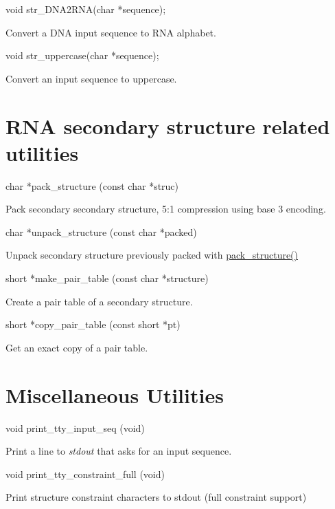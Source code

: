 \begin{DoxyVerb}void str_DNA2RNA(char *sequence);
\end{DoxyVerb}
 Convert a D\+NA input sequence to R\+NA alphabet.

\begin{DoxyVerb}void str_uppercase(char *sequence);
\end{DoxyVerb}
 Convert an input sequence to uppercase.

\hypertarget{mp_utils_utils_struc}{}\section{R\+N\+A secondary structure related utilities}\label{mp_utils_utils_struc}
\begin{DoxyVerb}char *pack_structure (const char *struc)
\end{DoxyVerb}
 Pack secondary secondary structure, 5\+:1 compression using base 3 encoding.

\begin{DoxyVerb}char *unpack_structure (const char *packed)
\end{DoxyVerb}
 Unpack secondary structure previously packed with \mbox{\hyperlink{group__struct__utils_gac6dfa5e22928c087c6e09ff0054a7ced}{pack\+\_\+structure()}}

\begin{DoxyVerb}short *make_pair_table (const char *structure)
\end{DoxyVerb}
 Create a pair table of a secondary structure.

\begin{DoxyVerb}short *copy_pair_table (const short *pt)
\end{DoxyVerb}
 Get an exact copy of a pair table.

\hypertarget{mp_utils_utils_misc}{}\section{Miscellaneous Utilities}\label{mp_utils_utils_misc}
\begin{DoxyVerb}void print_tty_input_seq (void)
\end{DoxyVerb}
 Print a line to {\itshape stdout} that asks for an input sequence.

\begin{DoxyVerb}void print_tty_constraint_full (void)
\end{DoxyVerb}
 Print structure constraint characters to stdout (full constraint support)

